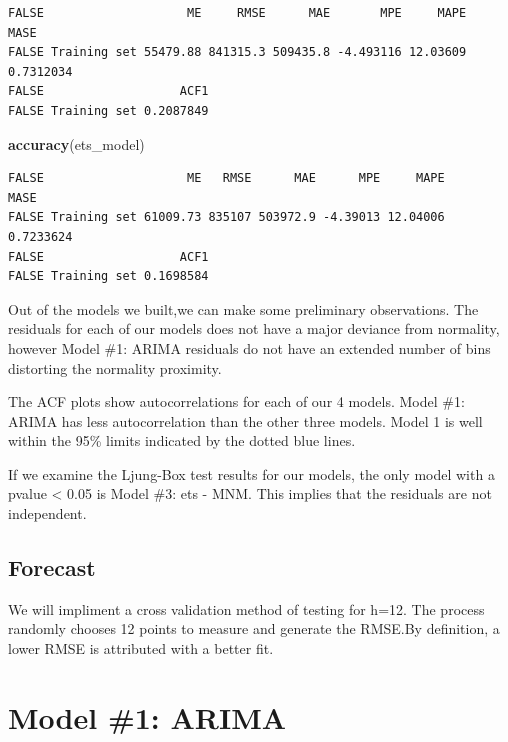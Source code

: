 \documentclass[openany]{book}
\newenvironment{Shaded}{\begin{snugshade}}{\end{snugshade}}
\newcommand{\KeywordTok}[1]{\textcolor[rgb]{0.13,0.29,0.53}{\textbf{#1}}}
\newcommand{\NormalTok}[1]{#1}
\begin{document}
\begin{verbatim}
FALSE                    ME     RMSE      MAE       MPE     MAPE      MASE
FALSE Training set 55479.88 841315.3 509435.8 -4.493116 12.03609 0.7312034
FALSE                   ACF1
FALSE Training set 0.2087849
\end{verbatim}

\begin{Shaded}
\begin{Highlighting}[]
\KeywordTok{accuracy}\NormalTok{(ets_model)}
\end{Highlighting}
\end{Shaded}

\begin{verbatim}
FALSE                    ME   RMSE      MAE      MPE     MAPE      MASE
FALSE Training set 61009.73 835107 503972.9 -4.39013 12.04006 0.7233624
FALSE                   ACF1
FALSE Training set 0.1698584
\end{verbatim}

Out of the models we built,we can make some preliminary observations.
The residuals for each of our models does not have a major deviance from
normality, however Model \#1: ARIMA residuals do not have an extended
number of bins distorting the normality proximity.

The ACF plots show autocorrelations for each of our 4 models. Model \#1:
ARIMA has less autocorrelation than the other three models. Model 1 is
well within the 95\% limits indicated by the dotted blue lines.

If we examine the Ljung-Box test results for our models, the only model
with a pvalue \textless{} 0.05 is Model \#3: ets - MNM. This implies
that the residuals are not independent.

\section*{Forecast}\label{b-forecast}

We will impliment a cross validation method of testing for h=12. The
process randomly chooses 12 points to measure and generate the RMSE.By
definition, a lower RMSE is attributed with a better fit.

\chapter{Model \#1: ARIMA}\label{model-1-arima-1}
\end{document}

